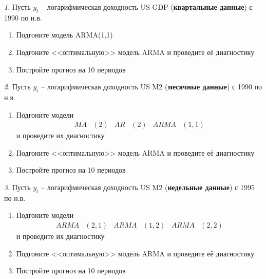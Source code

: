 \documentclass[12pt]{article}
\theoremstyle{remark}
\newtheorem{exercise}{}[subsection]
\begin{document}
\begin{exercise}
Пусть \(y_t\) -- логарифмическая доходность US GDP (\textbf{квартальные данные}) с 1990 по н.в.
\begin{enumerate}
	\item Подгоните модель ARMA(1,1)
	\item Подгоните <<оптимальную>> модель ARMA и проведите её диагностику
	\item Постройте прогноз на 10 периодов
\end{enumerate}
\end{exercise}

\begin{exercise}
Пусть \(y_t\) -- логарифмическая доходность US M2 (\textbf{месячные данные}) с 1990 по н.в.
\begin{enumerate}
	\item Подгоните модели
	\begin{align*}
		MA&(2) & AR&(2) & ARMA&(1,1) 
	\end{align*} 
	и проведите их диагностику
	\item Подгоните <<оптимальную>> модель ARMA и проведите её диагностику
	\item Постройте прогноз на 10 периодов
\end{enumerate}
\end{exercise}

\begin{exercise}
Пусть \(y_t\) -- логарифмическая доходность US M2 (\textbf{недельные данные}) с 1995 по н.в.
\begin{enumerate}
	\item Подгоните модели
	\begin{align*}
		ARMA&(2,1) & ARMA&(1,2) & ARMA&(2,2)
	\end{align*} 
	и проведите их диагностику
	\item Подгоните <<оптимальную>> модель ARMA и проведите её диагностику
	\item Постройте прогноз на 10 периодов
\end{enumerate}
\end{exercise}
\end{document}
